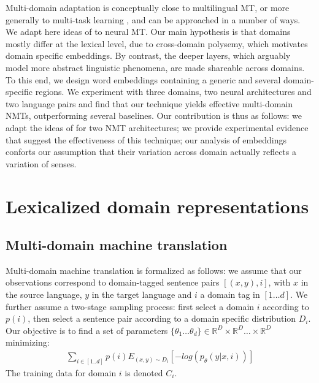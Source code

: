 \documentclass[11pt,a4paper]{article}
\newcommand{\fyDone}[1]{\done[FY]\Todo[FY:]{\textcolor{orange}{#1}}}
\begin{document}
Multi-domain adaptation is conceptually close to multilingual MT, or more generally to multi-task learning \cite{Caruana97multitask}, and can be approached in a number of ways. We adapt here ideas of \citet{Daume07frustratingly} to neural MT.
Our main hypothesis is that domains mostly differ at the lexical level, due to cross-domain polysemy, which motivates domain specific embeddings. By contrast, the deeper layers, which arguably model more abstract linguistic phenomena, are made shareable across domains. To this end, we design word embeddings containing a generic and several domain-specific regions. We experiment with three domains, two neural architectures and two language pairs and find that our technique yields effective multi-domain NMTs, outperforming several baselines. Our contribution is thus as follows:
we adapt the ideas of \cite{Daume07frustratingly} for two NMT architectures;
we provide experimental evidence that suggest the effectiveness of this technique;
our analysis of embeddings conforts our assumption that their variation across domain actually reflects a variation of senses.
\fyDone{can we train in random order ? can we get away with catastrophic forgetting ?}
\fyDone{how to analyze the embeddings ? how can we test or claim ?}

\section{Lexicalized domain representations\label{sec:lexicalized_embeddings}}
\fyDone{Use meaningful titles throughout}

\subsection{Multi-domain machine translation \label{ssec:statement}}

Multi-domain machine translation is formalized as follows: we assume that our observations correspond to  domain-tagged sentence pairs $[(x,y),i]$, with $x$ in the source language, $y$ in the target language and $i$ a domain tag in $[1\dots d]$. We further assume a two-stage sampling process: first select a domain $i$ according to $p(i)$, then select a sentence pair according to a domain specific distribution $D_i$. Our objective is to find a set of parameters $\{\theta_1 \dots \theta_d \} \in \mathbb{R}^D \times \mathbb{R}^D \dots \times \mathbb{R}^D$ minimizing:
\begin{equation} \label{eq:loss}
\begin{split}
\sum_{i \in [1..d]} p(i) E_{(x,y) \sim D_{i}} [-log(p_{\theta}(y|x,i))]
\end{split}
\end{equation}
The training data for domain $i$ is denoted $C_i$.
\end{document}
